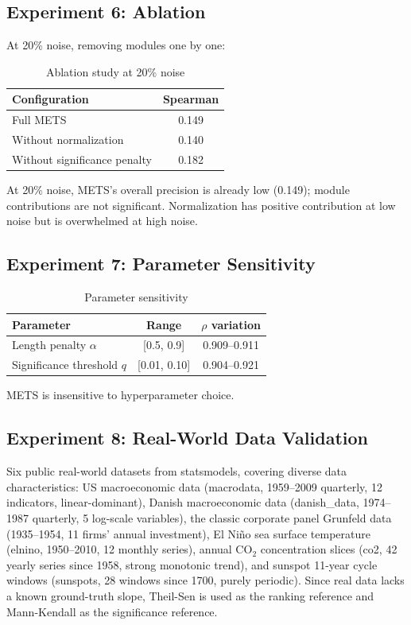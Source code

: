 \documentclass[11pt]{article}
\begin{document}
\subsection{Experiment 6: Ablation}
At 20\% noise, removing modules one by one:
\begin{table}[htbp]
\centering
\caption{Ablation study at 20\% noise}
\label{tab:ablation}
\begin{tabular}{lc}
\toprule
Configuration & Spearman \\
\midrule
Full METS & 0.149 \\
Without normalization & 0.140 \\
Without significance penalty & 0.182 \\
\bottomrule
\end{tabular}
\end{table}

At 20\% noise, METS's overall precision is already low (0.149); module contributions are not significant. Normalization has positive contribution at low noise but is overwhelmed at high noise.

\subsection{Experiment 7: Parameter Sensitivity}
\begin{table}[htbp]
\centering
\caption{Parameter sensitivity}
\label{tab:sens}
\begin{tabular}{lcc}
\toprule
Parameter & Range & $\rho$ variation \\
\midrule
Length penalty $\alpha$ & [0.5, 0.9] & 0.909--0.911 \\
Significance threshold $q$ & [0.01, 0.10] & 0.904--0.921 \\
\bottomrule
\end{tabular}
\end{table}

METS is insensitive to hyperparameter choice.

\subsection{Experiment 8: Real-World Data Validation}
Six public real-world datasets from statsmodels, covering diverse data characteristics: US macroeconomic data (macrodata, 1959--2009 quarterly, 12 indicators, linear-dominant), Danish macroeconomic data (danish\_data, 1974--1987 quarterly, 5 log-scale variables), the classic corporate panel Grunfeld data (1935--1954, 11 firms' annual investment), El Ni\~no sea surface temperature (elnino, 1950--2010, 12 monthly series), annual CO$_2$ concentration slices (co2, 42 yearly series since 1958, strong monotonic trend), and sunspot 11-year cycle windows (sunspots, 28 windows since 1700, purely periodic). Since real data lacks a known ground-truth slope, Theil-Sen is used as the ranking reference and Mann-Kendall as the significance reference.
\end{document}
